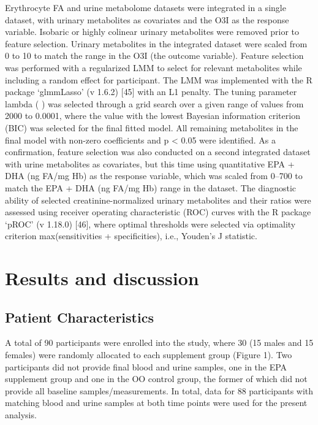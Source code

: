 \documentclass[journal=jacsat,manuscript=article]{achemso}
\begin{document}
Erythrocyte FA and urine metabolome datasets were integrated in a single
dataset, with urinary metabolites as covariates and the O3I as the
response variable. Isobaric or highly colinear urinary metabolites were
removed prior to feature selection. Urinary metabolites in the
integrated dataset were scaled from 0 to 10 to match the range in the
O3I (the outcome variable). Feature selection was performed with a
regularized LMM to select for relevant metabolites while including a
random effect for participant. The LMM was implemented with the R
package `glmmLasso' (v 1.6.2) {[}45{]} with an L1 penalty. The tuning
parameter lambda ( ) was selected through a grid search over a given
range of values from 2000 to 0.0001, where the value with the lowest
Bayesian information criterion (BIC) was selected for the final fitted
model. All remaining metabolites in the final model with non-zero
coefficients and p \textless{} 0.05 were identified. As a confirmation,
feature selection was also conducted on a second integrated dataset with
urine metabolites as covariates, but this time using quantitative EPA +
DHA (ng FA/mg Hb) as the response variable, which was scaled from 0--700
to match the EPA + DHA (ng FA/mg Hb) range in the dataset. The
diagnostic ability of selected creatinine-normalized urinary metabolites
and their ratios were assessed using receiver operating characteristic
(ROC) curves with the R package `pROC' (v 1.18.0) {[}46{]}, where
optimal thresholds were selected via optimality criterion
max(sensitivities + specificities), i.e., Youden's J statistic.

\section{Results and discussion}\label{results-and-discussion}

\subsection{Patient Characteristics}\label{patient-characteristics}

A total of 90 participants were enrolled into the study, where 30 (15
males and 15 females) were randomly allocated to each supplement group
(Figure 1). Two participants did not provide final blood and urine
samples, one in the EPA supplement group and one in the OO control
group, the former of which did not provide all baseline
samples/measurements. In total, data for 88 participants with matching
blood and urine samples at both time points were used for the present
analysis.
\end{document}
